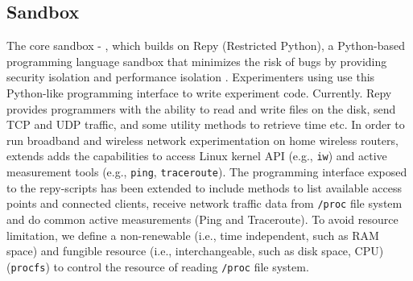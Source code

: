 \subsection{Sandbox}
\label{sec.sandbox}
The core sandbox - \sandboxname, which builds on Repy (Restricted Python), a
Python-based programming language sandbox that minimizes the risk of bugs by
providing security isolation and performance isolation .
 Experimenters using \sysname use this Python-like programming interface to write experiment code. Currently.
Repy provides programmers with the ability to read and write files on the disk,
 send TCP and UDP traffic, and some utility methods to retrieve time etc.
 In order to run broadband and wireless network experimentation on home wireless routers,
  \sysname extends adds the capabilities to access Linux kernel API (e.g., \texttt{iw})
   and active measurement tools (e.g., \texttt{ping}, \texttt{traceroute}). The programming interface exposed to the repy-scripts has been extended to include methods to list available access points and connected clients, receive network traffic data from \texttt{/proc} file system and do common active measurements (Ping and Traceroute). To avoid resource limitation, we define a non-renewable (i.e., time independent, such as RAM space) and fungible resource (i.e., interchangeable, such as disk space, CPU) \cite{li2015fence} (\texttt{procfs}) to control the resource of reading \texttt{/proc} file system.

